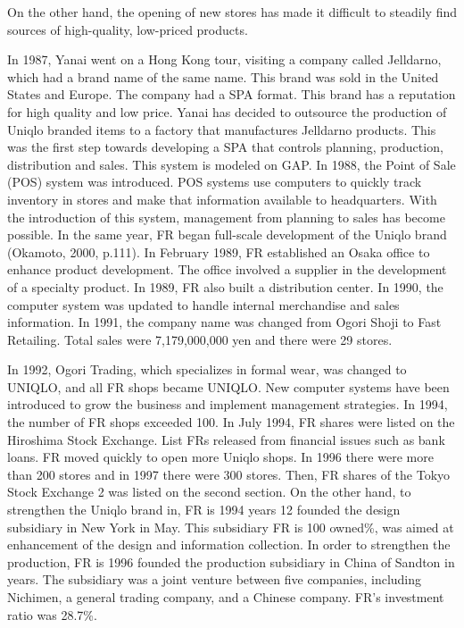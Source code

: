 \documentclass[12pt,a4paper]{article}
\begin{document}
On the other hand, the opening of new stores has made it difficult to
steadily find sources of high-quality, low-priced products.

In 1987, Yanai went on a Hong Kong tour, visiting a company called
Jelldarno, which had a brand name of the same name. This brand was sold
in the United States and Europe. The company had a SPA format. This
brand has a reputation for high quality and low price. Yanai has decided
to outsource the production of Uniqlo branded items to a factory that
manufactures Jelldarno products. This was the first step towards
developing a SPA that controls planning, production, distribution and
sales. This system is modeled on GAP. In 1988, the Point of Sale (POS)
system was introduced. POS systems use computers to quickly track
inventory in stores and make that information available to headquarters.
With the introduction of this system, management from planning to sales
has become possible. In the same year, FR began full-scale development
of the Uniqlo brand (Okamoto, 2000, p.111). In February 1989, FR
established an Osaka office to enhance product development. The office
involved a supplier in the development of a specialty product. In 1989,
FR also built a distribution center. In 1990, the computer system was
updated to handle internal merchandise and sales information. In 1991,
the company name was changed from Ogori Shoji to Fast Retailing. Total
sales were 7,179,000,000 yen and there were 29 stores.

In 1992, Ogori Trading, which specializes in formal wear, was changed to
UNIQLO, and all FR shops became UNIQLO. New computer systems have been
introduced to grow the business and implement management strategies. In
1994, the number of FR shops exceeded 100. In July 1994, FR shares were
listed on the Hiroshima Stock Exchange. List FRs released from financial
issues such as bank loans. FR moved quickly to open more Uniqlo shops.
In 1996 there were more than 200 stores and in 1997 there were 300
stores. Then, FR shares of the Tokyo Stock Exchange 2 was listed on the
second section. On the other hand, to strengthen the Uniqlo brand in, FR
is 1994 years 12 founded the design subsidiary in New York in May. This
subsidiary FR is 100 owned\%, was aimed at enhancement of the design and
information collection. In order to strengthen the production, FR is
1996 founded the production subsidiary in China of Sandton in years. The
subsidiary was a joint venture between five companies, including
Nichimen, a general trading company, and a Chinese company. FR's
investment ratio was 28.7\%.
\end{document}
